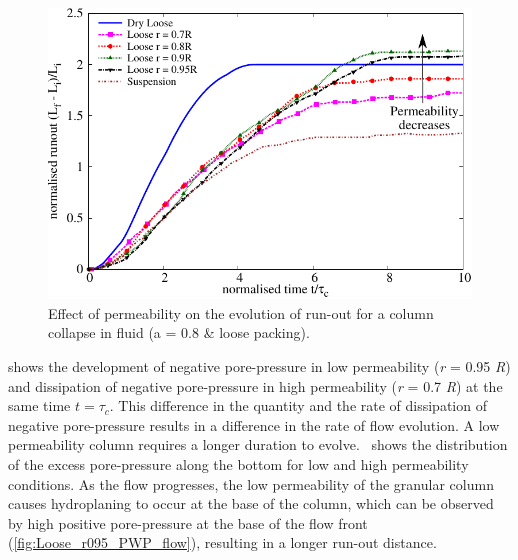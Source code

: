 \documentclass[12pt,a4paper,twocolumn,fleqn]{narms}
\begin{document}
\begin{figure}
\centering
\includegraphics[width=0.9\linewidth]{figs/Runout_a08_loose.pdf}
\caption{Effect of permeability on the evolution of run-out for a column 
collapse in fluid (a = 0.8 \& loose packing).}
\label{fig:Runout_a08_loose}
\end{figure}

 shows the development of negative pore-pressure in low 
permeability (\textit{r} = 0.95 \textit{R}) and dissipation of negative 
pore-pressure in high permeability (\textit{r} = 0.7 \textit{R}) at the same 
time $ t = \tau_c$. This difference in the quantity and the rate of dissipation 
of negative pore-pressure results in a difference in the rate of flow 
evolution. A low permeability column requires a longer duration to 
evolve.~ shows the distribution of the excess 
pore-pressure along the bottom for low and high permeability conditions. As the 
flow progresses, the low permeability of the granular column causes 
hydroplaning to occur at the base of the column, which can be observed by high 
positive pore-pressure at the base of the flow front 
(\cref{fig:Loose_r095_PWP_flow}), resulting in a 
longer run-out distance.
\end{document}

